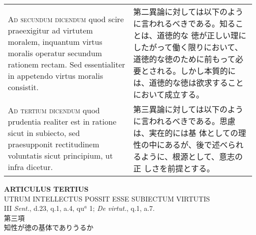 \documentclass[10pt]{jsarticle}
\begin{document}
\begin{longtable}{p{21em}p{21em}}
\\

{\scshape Ad secundum dicendum} quod scire praeexigitur ad virtutem
moralem, inquantum virtus moralis operatur secundum rationem
rectam. Sed essentialiter in appetendo virtus moralis consistit.

&

第二異論に対しては以下のように言われるべきである。知ることは、道徳的な
徳が正しい理にしたがって働く限りにおいて、道徳的な徳のために前もって必
要とされる。しかし本質的には、道徳的な徳は欲求することにおいて成立する。

\\

{\scshape Ad tertium dicendum} quod prudentia realiter est in ratione
sicut in subiecto, sed praesupponit rectitudinem voluntatis sicut
principium, ut infra dicetur.

&

第三異論に対しては以下のように言われるべきである。思慮は、実在的には基
体としての理性の中にあるが、後で述べられるように、根源として、意志の正
しさを前提とする。

\end{longtable}
\newpage

\begin{center}
{\Large {\bf ARTICULUS TERTIUS}}\\
{\large UTRUM INTELLECTUS POSSIT ESSE SUBIECTUM VIRTUTIS}\\
{\footnotesize III {\itshape Sent.}, d.23, q.1, a.4, qu$^{a}$ 1;
 {\itshape De virtut.}, q.1, a.7.}\\
{\Large 第三項\\知性が徳の基体でありうるか}
\end{center}
\end{document}
